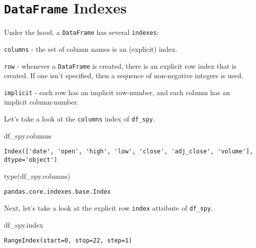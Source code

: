 \documentclass[
  letterpaper,
  DIV=11,
  numbers=noendperiod]{scrreprt}
\newenvironment{Shaded}{\begin{snugshade}}{\end{snugshade}}
\newcommand{\BuiltInTok}[1]{\textcolor[rgb]{0.00,0.23,0.31}{#1}}
\newcommand{\NormalTok}[1]{\textcolor[rgb]{0.00,0.23,0.31}{#1}}
\begin{document}
\hypertarget{dataframe-indexes}{%
\section{\texorpdfstring{\texttt{DataFrame}
Indexes}{DataFrame Indexes}}\label{dataframe-indexes}}

Under the hood, a \texttt{DataFrame} has several \texttt{indexes}:

\texttt{columns} - the set of column names is an (explicit) index.

\texttt{row} - whenever a \texttt{DataFrame} is created, there is an
explicit row index that is created. If one isn't specified, then a
sequence of non-negative integers is used.

\texttt{implicit} - each row has an implicit row-number, and each column
has an implicit column-number.

Let's take a look at the \texttt{columns} index of \texttt{df\_spy}.

\begin{Shaded}
\begin{Highlighting}[]
\NormalTok{df\_spy.columns}
\end{Highlighting}
\end{Shaded}

\begin{verbatim}
Index(['date', 'open', 'high', 'low', 'close', 'adj_close', 'volume'], dtype='object')
\end{verbatim}

\begin{Shaded}
\begin{Highlighting}[]
\BuiltInTok{type}\NormalTok{(df\_spy.columns)}
\end{Highlighting}
\end{Shaded}

\begin{verbatim}
pandas.core.indexes.base.Index
\end{verbatim}

Next, let's take a look at the explicit row \texttt{index} attribute of
\texttt{df\_spy}.

\begin{Shaded}
\begin{Highlighting}[]
\NormalTok{df\_spy.index}
\end{Highlighting}
\end{Shaded}

\begin{verbatim}
RangeIndex(start=0, stop=22, step=1)
\end{verbatim}
\end{document}
